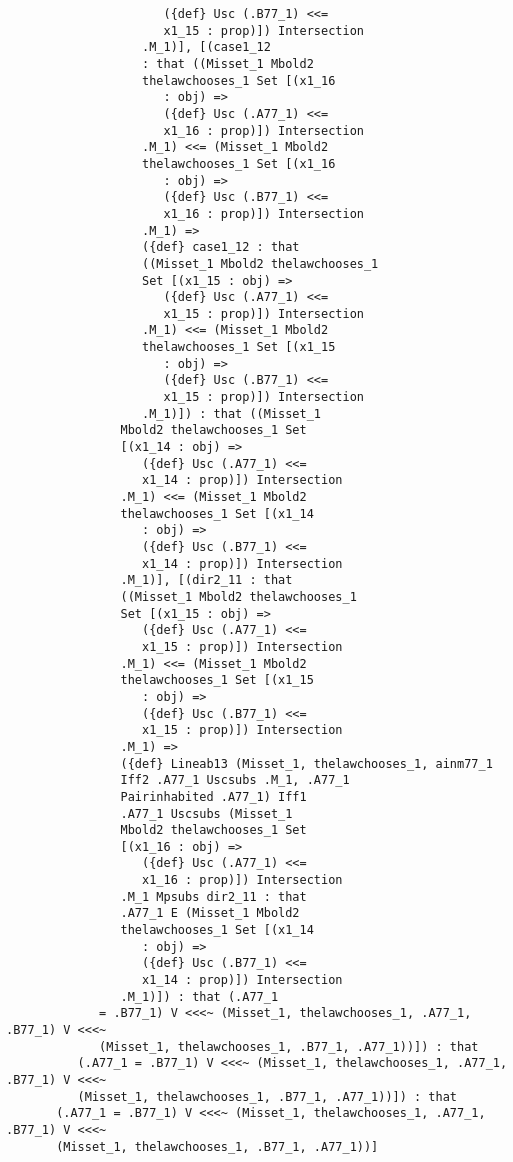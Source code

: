 \documentclass[12pt]{article}
\begin{document}
\begin{verbatim}
                      ({def} Usc (.B77_1) <<= 
                      x1_15 : prop)]) Intersection 
                   .M_1)], [(case1_12 
                   : that ((Misset_1 Mbold2 
                   thelawchooses_1 Set [(x1_16 
                      : obj) => 
                      ({def} Usc (.A77_1) <<= 
                      x1_16 : prop)]) Intersection 
                   .M_1) <<= (Misset_1 Mbold2 
                   thelawchooses_1 Set [(x1_16 
                      : obj) => 
                      ({def} Usc (.B77_1) <<= 
                      x1_16 : prop)]) Intersection 
                   .M_1) => 
                   ({def} case1_12 : that 
                   ((Misset_1 Mbold2 thelawchooses_1 
                   Set [(x1_15 : obj) => 
                      ({def} Usc (.A77_1) <<= 
                      x1_15 : prop)]) Intersection 
                   .M_1) <<= (Misset_1 Mbold2 
                   thelawchooses_1 Set [(x1_15 
                      : obj) => 
                      ({def} Usc (.B77_1) <<= 
                      x1_15 : prop)]) Intersection 
                   .M_1)]) : that ((Misset_1 
                Mbold2 thelawchooses_1 Set 
                [(x1_14 : obj) => 
                   ({def} Usc (.A77_1) <<= 
                   x1_14 : prop)]) Intersection 
                .M_1) <<= (Misset_1 Mbold2 
                thelawchooses_1 Set [(x1_14 
                   : obj) => 
                   ({def} Usc (.B77_1) <<= 
                   x1_14 : prop)]) Intersection 
                .M_1)], [(dir2_11 : that 
                ((Misset_1 Mbold2 thelawchooses_1 
                Set [(x1_15 : obj) => 
                   ({def} Usc (.A77_1) <<= 
                   x1_15 : prop)]) Intersection 
                .M_1) <<= (Misset_1 Mbold2 
                thelawchooses_1 Set [(x1_15 
                   : obj) => 
                   ({def} Usc (.B77_1) <<= 
                   x1_15 : prop)]) Intersection 
                .M_1) => 
                ({def} Lineab13 (Misset_1, thelawchooses_1, ainm77_1 
                Iff2 .A77_1 Uscsubs .M_1, .A77_1 
                Pairinhabited .A77_1) Iff1 
                .A77_1 Uscsubs (Misset_1 
                Mbold2 thelawchooses_1 Set 
                [(x1_16 : obj) => 
                   ({def} Usc (.A77_1) <<= 
                   x1_16 : prop)]) Intersection 
                .M_1 Mpsubs dir2_11 : that 
                .A77_1 E (Misset_1 Mbold2 
                thelawchooses_1 Set [(x1_14 
                   : obj) => 
                   ({def} Usc (.B77_1) <<= 
                   x1_14 : prop)]) Intersection 
                .M_1)]) : that (.A77_1 
             = .B77_1) V <<<~ (Misset_1, thelawchooses_1, .A77_1, .B77_1) V <<<~ 
             (Misset_1, thelawchooses_1, .B77_1, .A77_1))]) : that 
          (.A77_1 = .B77_1) V <<<~ (Misset_1, thelawchooses_1, .A77_1, .B77_1) V <<<~ 
          (Misset_1, thelawchooses_1, .B77_1, .A77_1))]) : that 
       (.A77_1 = .B77_1) V <<<~ (Misset_1, thelawchooses_1, .A77_1, .B77_1) V <<<~ 
       (Misset_1, thelawchooses_1, .B77_1, .A77_1))]



\end{verbatim}
\end{document}
